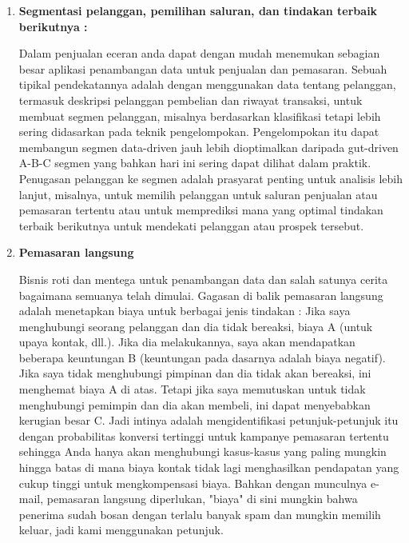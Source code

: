 \begin{enumerate}
    \item \textbf{Segmentasi pelanggan, pemilihan saluran, dan tindakan terbaik berikutnya :}
  \par Dalam penjualan eceran anda dapat dengan mudah menemukan sebagian besar aplikasi penambangan data untuk penjualan dan pemasaran. Sebuah tipikal pendekatannya adalah dengan menggunakan data tentang pelanggan, termasuk deskripsi pelanggan pembelian dan riwayat transaksi, untuk membuat segmen pelanggan, misalnya berdasarkan klasifikasi tetapi lebih sering didasarkan pada teknik pengelompokan. Pengelompokan itu dapat membangun segmen data-driven jauh lebih dioptimalkan daripada gut-driven A-B-C segmen yang bahkan hari ini sering dapat dilihat dalam praktik. Penugasan pelanggan ke segmen adalah prasyarat penting untuk analisis lebih lanjut, misalnya, untuk memilih pelanggan untuk saluran penjualan atau pemasaran tertentu atau untuk memprediksi mana yang optimal tindakan terbaik berikutnya untuk mendekati pelanggan atau prospek tersebut.
  
  \item	\textbf{Pemasaran langsung}
  
  \par Bisnis roti dan mentega untuk penambangan data dan salah satunya cerita bagaimana semuanya telah dimulai. Gagasan di balik pemasaran langsung adalah menetapkan biaya untuk berbagai jenis tindakan : Jika saya menghubungi seorang pelanggan dan dia tidak bereaksi, biaya  A (untuk upaya kontak, dll.). Jika dia melakukannya, saya akan mendapatkan beberapa keuntungan B (keuntungan pada dasarnya adalah biaya negatif). Jika saya tidak menghubungi pimpinan dan dia tidak akan bereaksi, ini menghemat biaya A di atas. Tetapi jika saya memutuskan untuk tidak menghubungi pemimpin dan dia akan membeli, ini dapat menyebabkan kerugian besar C. Jadi intinya adalah mengidentifikasi petunjuk-petunjuk itu dengan probabilitas konversi tertinggi untuk kampanye pemasaran tertentu sehingga Anda hanya akan menghubungi kasus-kasus yang paling mungkin hingga batas di mana biaya kontak tidak lagi menghasilkan pendapatan yang cukup tinggi untuk mengkompensasi biaya. Bahkan dengan munculnya e-mail, pemasaran langsung diperlukan, "biaya" di sini mungkin bahwa penerima sudah bosan dengan terlalu banyak spam dan mungkin memilih keluar, jadi kami menggunakan petunjuk.
  

\end{enumerate}
